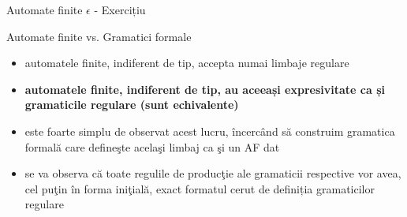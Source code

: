 \documentclass[pdf]{beamer}
\begin{document}
\begin{frame}{Automate finite $\epsilon$ - Exercițiu}
\begin{figure}[H]
\centering
{}
\end{figure}
\end{frame}



\begin{frame}{Automate finite vs. Gramatici formale}
\begin{itemize}
\item
automatele finite, indiferent de tip, accepta numai limbaje regulare
\item
\textbf{automatele finite, indiferent de tip, au aceeași expresivitate ca și gramaticile regulare (sunt echivalente)}
\item
este foarte simplu de observat acest lucru, încercând să construim gramatica formală care defineşte acelaşi limbaj ca şi un AF dat
\item
se va observa că toate regulile de producţie ale gramaticii respective vor avea, cel puţin în forma iniţială, exact formatul cerut de definiția gramaticilor regulare
\end{itemize}
\end{frame}
\end{document}
